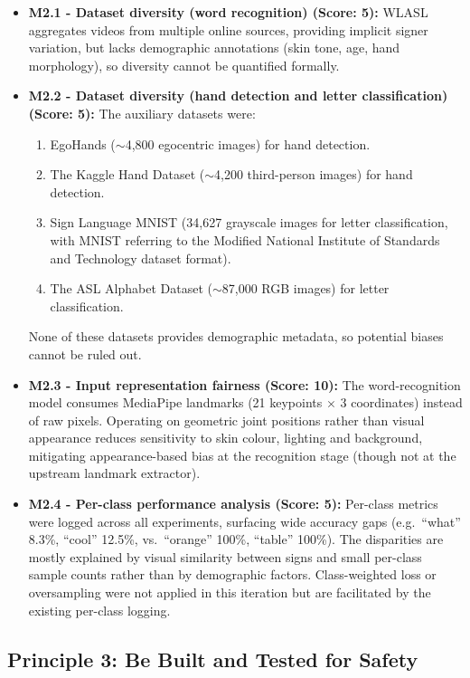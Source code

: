 \begin{itemize}
    \item \textbf{M2.1 - Dataset diversity (word recognition) (Score: 5):} WLASL aggregates videos from multiple online sources, providing implicit signer variation, but lacks demographic annotations (skin tone, age, hand morphology), so diversity cannot be quantified formally.
    \item \textbf{M2.2 - Dataset diversity (hand detection and letter classification) (Score: 5):} The auxiliary datasets were:
          \begin{enumerate}
              \item EgoHands ($\sim$4{,}800 egocentric images) for hand detection.
              \item The Kaggle Hand Dataset ($\sim$4{,}200 third-person images) for hand detection.
              \item Sign Language MNIST (34{,}627 grayscale images for letter classification, with
                    MNIST referring to the Modified National Institute of Standards and Technology
                    dataset format).
              \item The ASL Alphabet Dataset ($\sim$87{,}000 RGB images) for letter classification.
          \end{enumerate}
          None of these datasets provides demographic metadata, so potential biases cannot be ruled out.
    \item \textbf{M2.3 - Input representation fairness (Score: 10):} The word-recognition model consumes MediaPipe landmarks (21 keypoints $\times$ 3 coordinates) instead of raw pixels. Operating on geometric joint positions rather than visual appearance reduces sensitivity to skin colour, lighting and background, mitigating appearance-based bias at the recognition stage (though not at the upstream landmark extractor).
    \item \textbf{M2.4 - Per-class performance analysis (Score: 5):} Per-class metrics were logged across all experiments, surfacing wide accuracy gaps (e.g.\ ``what'' 8.3\%, ``cool'' 12.5\%, vs.\ ``orange'' 100\%, ``table'' 100\%). The disparities are mostly explained by visual similarity between signs and small per-class sample counts rather than by demographic factors. Class-weighted loss or oversampling were not applied in this iteration but are facilitated by the existing per-class logging.
\end{itemize}

\subsection{Principle 3: Be Built and Tested for Safety}

